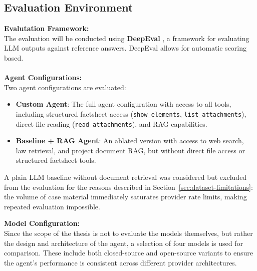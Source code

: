 \subsection{Evaluation Environment}
\textbf{Evalutation Framework:} \\
The evaluation will be conducted using \textbf{DeepEval} \cite{deepeval}, a framework for evaluating LLM outputs against reference answers. 
DeepEval allows for automatic scoring based. \\ \\

\textbf{Agent Configurations:} \\
Two agent configurations are evaluated:
\begin{itemize}
    \item \textbf{Custom Agent}: The full agent configuration with access to all tools, including structured factsheet access (\texttt{show\_elements}, \texttt{list\_attachments}), direct file reading (\texttt{read\_attachments}), and RAG capabilities.
    \item \textbf{Baseline + RAG Agent}: An ablated version with access to web search, law retrieval, and project document RAG, but without direct file access or structured factsheet tools.
\end{itemize}
A plain LLM baseline without document retrieval was considered but excluded from the evaluation for the reasons described in Section~\ref{sec:dataset-limitations}: the volume of case material immediately saturates provider rate limits, making repeated evaluation impossible.

\textbf{Model Configuration:} \\
Since the scope of the thesis is not to evaluate the models themselves, but rather the design and architecture of the agent, a selection of four models is used for comparison. 
These include both closed-source and open-source variants to ensure the agent's performance is consistent across different provider architectures.

